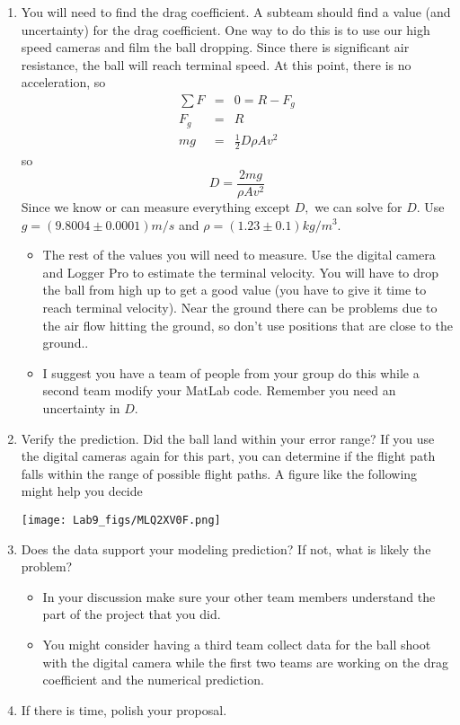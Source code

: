 \documentclass[twoside,11pt,ShortChapTitles]{BYUTextbook}
\begin{document}
\begin{enumerate}
\item You will need to find the drag coefficient. A subteam should find a
value (and uncertainty) for the drag coefficient. One way to do this is to
use our high speed cameras and film the ball dropping. Since there is
significant air resistance, the ball will reach terminal speed. At this
point, there is no acceleration, so 
\begin{eqnarray*}
\sum F &=&0=R-F_{g} \\
F_{g} &=&R \\
mg &=&\frac{1}{2}D\rho Av^{2}
\end{eqnarray*}%
so%
\[
D=\frac{2mg}{\rho Av^{2}} 
\]%
Since we know or can measure everything except $D,$ we can solve for $D.$
Use $g=\left( 9.8004\pm 0.0001\right) \unit{m}/\unit{s}$ and $\rho =\left(
1.23\pm 0.1\right) \unit{kg}/\unit{m}^{3}.$

\begin{itemize}
\item The rest of the values you will need to measure. Use the digital
camera and Logger Pro to estimate the terminal velocity. You will have to
drop the ball from high up to get a good value (you have to give it time to
reach terminal velocity). Near the ground there can be problems due to the
air flow hitting the ground, so don't use positions that are close to the
ground..

\item I suggest you have a team of people from your group do this while a
second team modify your MatLab code. Remember you need an uncertainty in $D.$
\end{itemize}

\item Verify the prediction. Did the ball land within your error range? If
you use the digital cameras again for this part, you can determine if the
flight path falls within the range of possible flight paths. A figure like
the following might help you decide 
\begin{center}
\texttt{[image: Lab9\_figs/MLQ2XV0F.png]}
\end{center}


\item Does the data support your modeling prediction? If not, what is likely
the problem?

\begin{itemize}
\item In your discussion make sure your other team members understand the
part of the project that you did.

\item You might consider having a third team collect data for the ball shoot
with the digital camera while the first two teams are working on the drag
coefficient and the numerical prediction.
\end{itemize}

\item If there is time, polish your proposal.
\end{enumerate}

\pagebreak
\end{document}
